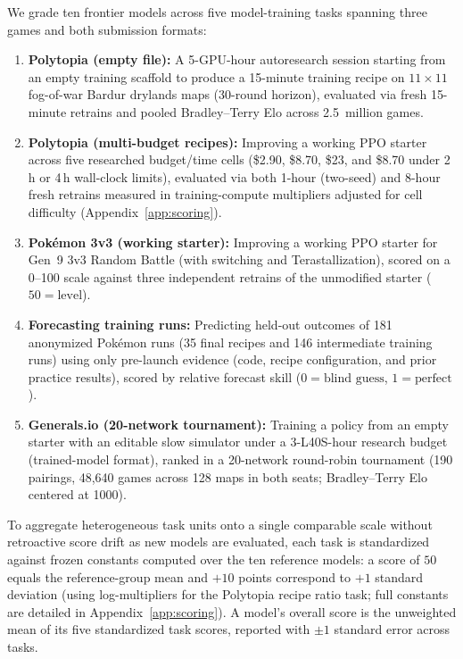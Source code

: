 \documentclass[11pt,letterpaper]{article}
\newcommand{\pokemon}{Pok\'emon}
\begin{document}
We grade ten frontier models across five model-training tasks spanning three games and both submission formats:
\begin{enumerate}[leftmargin=1.5em,itemsep=2pt]
  \item \textbf{Polytopia (empty file):} A 5-GPU-hour autoresearch session starting from an empty training scaffold to produce a 15-minute training recipe on $11{\times}11$ fog-of-war Bardur drylands maps (30-round horizon), evaluated via fresh 15-minute retrains and pooled Bradley--Terry Elo across 2.5~million games.
  \item \textbf{Polytopia (multi-budget recipes):} Improving a working PPO starter across five researched budget/time cells (\$2.90, \$8.70, \$23, and \$8.70 under 2\,h or 4\,h wall-clock limits), evaluated via both 1-hour (two-seed) and 8-hour fresh retrains measured in training-compute multipliers adjusted for cell difficulty (Appendix~\ref{app:scoring}).
  \item \textbf{\pokemon{} 3v3 (working starter):} Improving a working PPO starter for Gen~9 3v3 Random Battle (with switching and Terastallization), scored on a 0--100 scale against three independent retrains of the unmodified starter ($50 = \text{level}$).
  \item \textbf{Forecasting training runs:} Predicting held-out outcomes of 181 anonymized \pokemon{} runs (35 final recipes and 146 intermediate training runs) using only pre-launch evidence (code, recipe configuration, and prior practice results), scored by relative forecast skill ($0 = \text{blind guess}$, $1 = \text{perfect}$).
  \item \textbf{Generals.io (20-network tournament):} Training a policy from an empty starter with an editable slow simulator under a 3-L40S-hour research budget (trained-model format), ranked in a 20-network round-robin tournament (190 pairings, 48,640 games across 128 maps in both seats; Bradley--Terry Elo centered at 1000).
\end{enumerate}

To aggregate heterogeneous task units onto a single comparable scale without retroactive score drift as new models are evaluated, each task is standardized against frozen constants computed over the ten reference models: a score of $50$ equals the reference-group mean and $+10$ points correspond to $+1$ standard deviation (using log-multipliers for the Polytopia recipe ratio task; full constants are detailed in Appendix~\ref{app:scoring}). A model's overall score is the unweighted mean of its five standardized task scores, reported with $\pm 1$ standard error across tasks.
\end{document}
